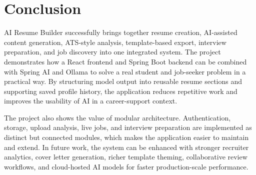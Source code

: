 \section{Conclusion}
\noindent AI Resume Builder successfully brings together resume creation, AI-assisted content generation, ATS-style analysis, template-based export, interview preparation, and job discovery into one integrated system. The project demonstrates how a React frontend and Spring Boot backend can be combined with Spring AI and Ollama to solve a real student and job-seeker problem in a practical way. By structuring model output into reusable resume sections and supporting saved profile history, the application reduces repetitive work and improves the usability of AI in a career-support context.

\noindent The project also shows the value of modular architecture. Authentication, storage, upload analysis, live jobs, and interview preparation are implemented as distinct but connected modules, which makes the application easier to maintain and extend. In future work, the system can be enhanced with stronger recruiter analytics, cover letter generation, richer template theming, collaborative review workflows, and cloud-hosted AI models for faster production-scale performance.
